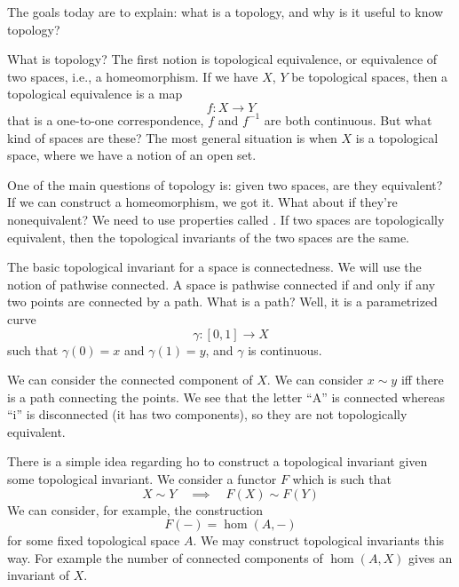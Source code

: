 
The goals today are to explain: what is a topology, and why is it
useful to know topology?

What is topology? The first notion is topological equivalence, or
equivalence of two spaces, i.e., a homeomorphism. If we have $X$,
$Y$ be topological spaces, then a topological equivalence is a
map
\begin{equation}
f\colon X\to Y
\end{equation}
that is a one-to-one correspondence, $f$ and $f^{-1}$ are both
continuous. But what kind of spaces are these? The most general
situation is when $X$ is a topological space, where we have a
notion of an open set.

One of the main questions of topology is: given two spaces, are
they equivalent? If we can construct a homeomorphism, we got
it. What about if they're nonequivalent? We need to use
properties called . If two spaces
are topologically equivalent, then the topological invariants of
the two spaces are the same.

The basic topological invariant for a space is
connectedness. We
will use the notion of pathwise connected. A space is pathwise
connected if and only if any two points are connected by a
path. What is a path? Well, it is a parametrized curve
\begin{equation}
\gamma\colon[0,1]\to X
\end{equation}
such that $\gamma(0)=x$ and $\gamma(1)=y$, and $\gamma$ is
continuous.

We can consider the connected component of $X$. We can consider
$x\sim y$ iff there is a path connecting the points. We see that
the letter ``A'' is connected whereas ``i'' is disconnected (it
has two components), so they are not topologically equivalent.

There is a simple idea regarding ho to construct a topological
invariant given some topological invariant. We consider a
functor $F$ which is such that
\begin{equation}
X\sim Y\quad\implies\quad F(X)\sim F(Y)
\end{equation}
We can consider, for example, the construction
\begin{equation}
F(-)=\hom(A,-)
\end{equation}
for some fixed topological space $A$. We may construct
topological invariants this way. For example the number of
connected components of $\hom(A,X)$ gives an invariant of $X$. 

